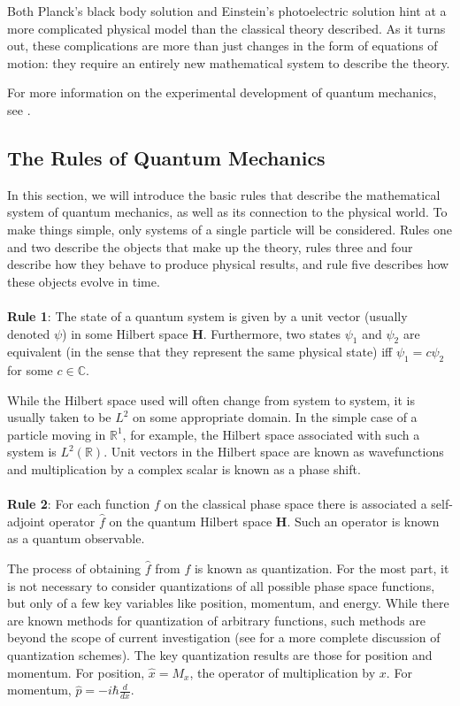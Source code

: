 Both Planck's black body solution and Einstein's photoelectric solution hint at
a more complicated physical model than the classical theory described.
As it turns out, these complications are more than just changes in the form of
equations of motion: they require an entirely new mathematical system to
describe the theory.

For more information on the experimental development of quantum mechanics, see
\cite[p. 1-16]{Hall2013}.

\subsection{The Rules of Quantum Mechanics}

In this section, we will introduce the basic rules that describe the
mathematical system of quantum mechanics, as well as its connection to the
physical world.  To make things simple, only systems of a single particle will
be considered. Rules one and two describe the objects that make up the
theory, rules three and four describe how they behave to produce physical
results, and rule five describes how these objects evolve in
time.\cite[p. 64]{Hall2013}
\\
\\
\textbf{Rule 1}: The state of a quantum system is given by a unit vector
(usually denoted $\psi$) in some Hilbert space \textbf{H}. Furthermore, two
states $\psi_1$ and $\psi_2$ are equivalent (in the sense that they represent
the same physical state) iff $\psi_1 = c\psi_2$ for some $c \in \mathbb{C}$.

While the Hilbert space used will often change from system to system, it is
usually taken to be $L^2$ on some appropriate domain. In the simple case of a
particle moving in $\mathbb{R}^1$, for example, the Hilbert space associated
with such a system is $L^2(\mathbb{R})$.
Unit vectors in the Hilbert space are known as wavefunctions and multiplication
by a complex scalar is known as a phase shift.
\\
\\
\textbf{Rule 2}: For each function $f$ on the classical phase space there is
associated a self-adjoint operator $\hat{f}$ on the quantum Hilbert space
\textbf{H}. Such an operator is known as a quantum observable.

The process of obtaining $\hat{f}$ from $f$ is known as quantization. For the
most part, it is not necessary to consider quantizations of all possible phase
space functions, but only of a few key variables like position,
momentum, and energy. While there are known methods for quantization of
arbitrary functions, such methods are beyond the scope of current investigation
(see \cite[p.255-275]{Hall2013} for a more complete discussion of quantization
schemes).  The key quantization results are those for position and momentum. For
position, $\hat{x} = M_x$, the operator of multiplication by $x$. For momentum,
$\hat{p} = -i\hbar
\frac{d}{dx}$.


